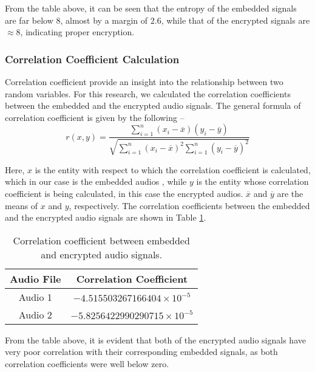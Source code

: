\documentclass{article}
\begin{document}
From the table above, it can be seen that the entropy of the embedded signals are far below $8$, almost by a margin of $2.6$, while that of the encrypted signals are $\approx8$, indicating proper encryption.
\subsubsection{Correlation Coefficient Calculation}
Correlation coefficient provide an insight into the relationship between two random variables. For this research, we calculated the correlation coefficients between the embedded and the encrypted audio signals. The general formula of correlation coefficient is given by the following --
\[r(x,y)=\frac{\sum_{i=1}^{n}(x_i-\overline{x})(y_i-\overline{y})}{\sqrt{\sum_{i=1}^{n}(x_i-\overline{x})^2\sum_{i=1}^{n}(y_i-\overline{y})^2}}\]

Here, $x$ is the entity with respect to which the correlation coefficient is calculated, which in our case is the embedded audios
, while $y$ is the entity whose correlation coefficient is being calculated, in this case the encrypted audios. $\overline{x}$ and $\overline{y}$ are the means of $x$ and $y$, respectively. The correlation coefficients between the embedded and the encrypted audio signals are shown in Table \ref{table:corrcoef}.
\begin{table}[!h]
    \begin{center}
        \caption{Correlation coefficient between embedded and encrypted audio signals.}
        \begin{tabular}{cc}
            \hline
            Audio File & Correlation Coefficient            \\ \hline
            Audio 1    & $-4.515503267166404\times10^{-5}$  \\ \hdashline
            Audio 2    & $-5.8256422990290715\times10^{-5}$ \\ \hline
        \end{tabular}
        \label{table:corrcoef}
    \end{center}
\end{table}

From the table above, it is evident that both of the encrypted audio signals have very poor correlation with their corresponding embedded signals, as both correlation coefficients were well below zero.
\end{document}
